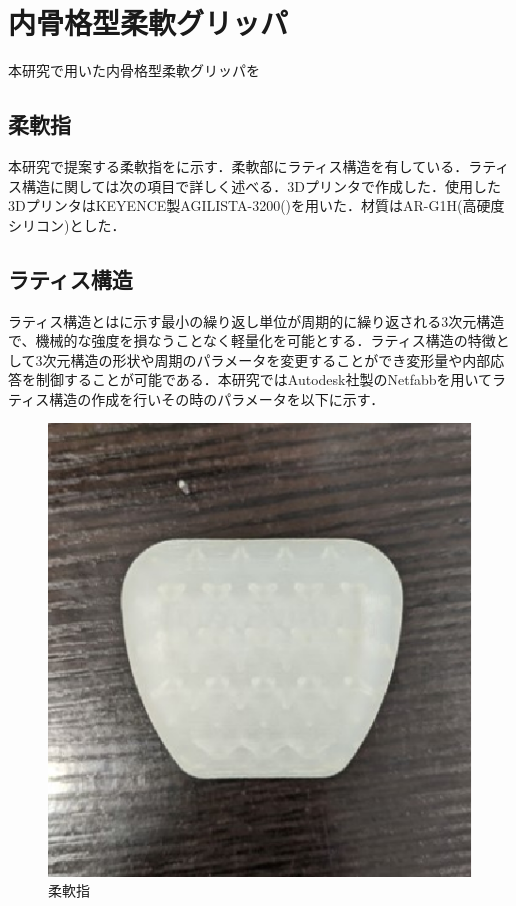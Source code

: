 \section{内骨格型柔軟グリッパ}
本研究で用いた内骨格型柔軟グリッパを
\subsection{柔軟指}
本研究で提案する柔軟指をに示す．柔軟部にラティス構造を有している．ラティス構造に関しては次の項目で詳しく述べる．3Dプリンタで作成した．使用した3DプリンタはKEYENCE製AGILISTA-3200()を用いた．材質はAR-G1H(高硬度シリコン)とした．

\subsection{ラティス構造}
ラティス構造とはに示す最小の繰り返し単位が周期的に繰り返される3次元構造で、機械的な強度を損なうことなく軽量化を可能とする\cite{latice}．ラティス構造の特徴として3次元構造の形状や周期のパラメータを変更することができ変形量や内部応答を制御することが可能である．本研究ではAutodesk社製のNetfabbを用いてラティス構造の作成を行いその時のパラメータを以下に示す．

\begin{figure}[h]
 \begin{center}
  \includegraphics[scale=0.6]{../fig/eps/soft_finger.eps}
 \caption{柔軟指}
  \label{fig::soft_finger}
 \end{center}
\end{figure}

